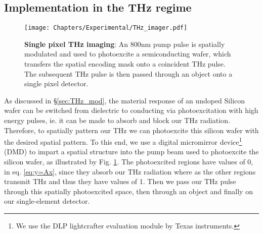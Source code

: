 \subsection{Implementation in the THz regime}\label{sec:optical_to_THz}
\begin{figure}[b!]\centering
\texttt{[image: Chapters/Experimental/THz\_imager.pdf]}
\caption{\textbf{Single pixel THz imaging}: An 800nm pump pulse is spatially modulated and used to photoexcite a semiconducting wafer, which transfers the spatial encoding mask onto a coincident THz pulse. The subsequent THz pulse is then passed through an object onto a single pixel detector.}
\label{fig:THz_imager}
\end{figure}
As discussed in \S\ref{sec:THz_mod}, the material response of an undoped Silicon wafer  can be switched from dielectric to conducting via photoexcitation with high energy pulses, ie. it can be made to absorb and block our THz radiation. Therefore, to spatially pattern our THz we can photoexcite this silicon wafer with the desired spatial pattern. To this end, we use a digital micromirror device\footnote{We use the DLP lightcrafter evaluation module by Texas instruments.} (DMD) to impart a spatial structure into the pump beam used to photoexcite the silicon wafer, as illustrated by Fig. \ref{fig:THz_imager}. The photoexcited regions have values of 0, in eq. \eqref{eq:y=Ax}, since they absorb our THz radiation where as the other regions transmit THz and thus they have values of 1. Then we pass our THz pulse through this spatially photoexcited space, then through an object and finally on our single-element detector.



